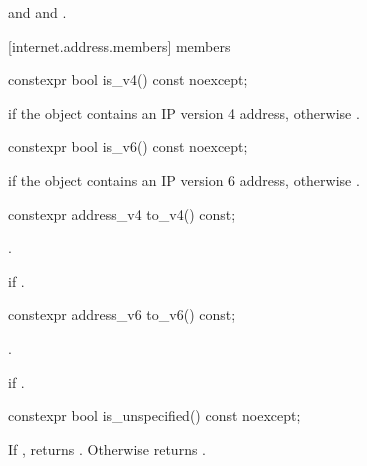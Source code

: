 \begin{itemdescr}
\pnum
\postconditions {} and  and .

\pnum
\returns {}
\end{itemdescr}



[internet.address.members]{ members}

\begin{itemdecl}
constexpr bool is_v4() const noexcept;
\end{itemdecl}

\begin{itemdescr}
\pnum
\returns {} if the object contains an IP version 4 address, otherwise .
\end{itemdescr}

\begin{itemdecl}
constexpr bool is_v6() const noexcept;
\end{itemdecl}

\begin{itemdescr}
\pnum
\returns {} if the object contains an IP version 6 address, otherwise .
\end{itemdescr}

\begin{itemdecl}
constexpr address_v4 to_v4() const;
\end{itemdecl}

\begin{itemdescr}
\pnum
\returns {}.

\pnum
\remarks {} if .
\end{itemdescr}

\begin{itemdecl}
constexpr address_v6 to_v6() const;
\end{itemdecl}

\begin{itemdescr}
\pnum
\returns {}.

\pnum
\remarks {} if .
\end{itemdescr}

\begin{itemdecl}
constexpr bool is_unspecified() const noexcept;
\end{itemdecl}

\begin{itemdescr}
\pnum
\returns If , returns . Otherwise returns .
\end{itemdescr}

